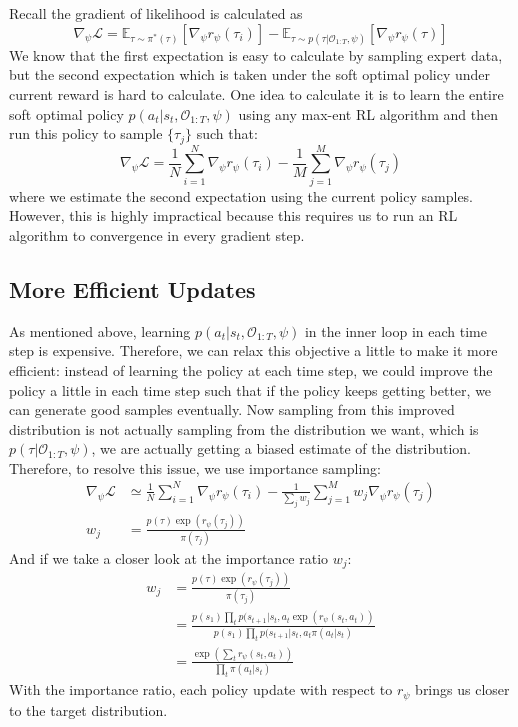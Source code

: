 Recall the gradient of likelihood is calculated as
\[
\nabla_\psi \mathcal{L} =\mathbb{E}_{\tau\sim\pi^*(\tau)}[\nabla_\psi r_\psi(\tau_i)] - \mathbb{E}_{\tau\sim p(\tau|\mathcal{O}_{1:T},\psi)}[\nabla_\psi r_\psi(\tau)]
\]
We know that the first expectation is easy to calculate by sampling expert data, but the second expectation which is taken under the soft optimal policy under current reward is hard to calculate. One idea to calculate it is to learn the entire soft optimal policy $p(a_t|s_t,\mathcal{O}_{1:T},\psi)$ using any max-ent RL algorithm and then run this policy to sample $\{\tau_j\}$ such that:
\[
\nabla_\psi \mathcal{L} = \frac{1}{N}\sum_{i=1}^N\nabla_\psi r_\psi(\tau_i) - \frac{1}{M}\sum_{j=1}^M\nabla_\psi r_\psi(\tau_j)
\]
where we estimate the second expectation using the current policy samples. However, this is highly impractical because this requires us to run an RL algorithm to convergence in every gradient step.
\subsection{More Efficient Updates}
As mentioned above, learning $p(a_t|s_t,\mathcal{O}_{1:T},\psi)$ in the inner loop in each time step is expensive. Therefore, we can relax this objective a little to make it more efficient: instead of learning the policy at each time step, we could improve the policy a little in each time step such that if the policy keeps getting better, we can generate good samples eventually. Now sampling from this improved distribution is not actually sampling from the distribution we want, which is $p(\tau|\mathcal{O}_{1:T},\psi)$, we are actually getting a biased estimate of the distribution. Therefore, to resolve this issue, we use importance sampling:
\begin{align*}
    \nabla_\psi \mathcal{L} &\simeq \frac{1}{N}\sum_{i=1}^N\nabla_\psi r_\psi(\tau_i) - \frac{1}{\sum_j w_j}\sum_{j=1}^M w_j\nabla_\psi r_\psi(\tau_j)\\
    w_j &= \frac{p(\tau)\exp(r_\psi(\tau_j))}{\pi(\tau_j)}
\end{align*}
And if we take a closer look at the importance ratio $w_j$:
\begin{align*}
     w_j &= \frac{p(\tau)\exp(r_\psi(\tau_j))}{\pi(\tau_j)}\\
     &= \frac{p(s_1)\prod_t p(s_{t+1}|s_t,a_t\exp(r_\psi(s_t,a_t))}{p(s_1)\prod_t p(s_{t+1}|s_t,a_t\pi(a_t|s_t)}\\
     &= \frac{\exp(\sum_tr_\psi(s_t,a_t))}{\prod_t\pi(a_t|s_t)}
\end{align*}
With the importance ratio, each policy update with respect to $r_\psi$ brings us closer to the target distribution.

